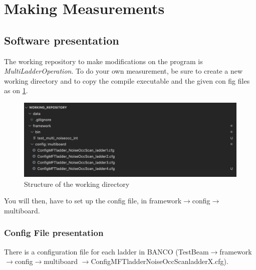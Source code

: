 \documentclass[12pt,oneside,a4]{article}
\begin{document}
\section{Making Measurements}
    \subsection{Software presentation}
The working repository to make modifications on the program is \textit{MultiLadderOperation}. To do your own measurement, be sure to create a new working directory and to copy the compile executable and the given con fig files as on \ref{fig:14}.

\begin{figure}[h]
        \centering
        \includegraphics[scale =0.3]{figures/Repository.png}
        \caption{Structure of the working directory}
        \label{fig:14}
\end{figure}

You will then, have to set up the config file, in framework$\rightarrow$config$\rightarrow$multiboard.

 \subsubsection{Config File presentation}\label{Config File presentation}
There is a configuration file for each ladder in BANCO (Test\textunderscore Beam$\rightarrow$framework$\rightarrow$config$\rightarrow$multiboard
$\rightarrow$ConfigMFTladder\textunderscore NoiseOccScan\textunderscore ladderX.cfg). 

\bigskip
\end{document}
